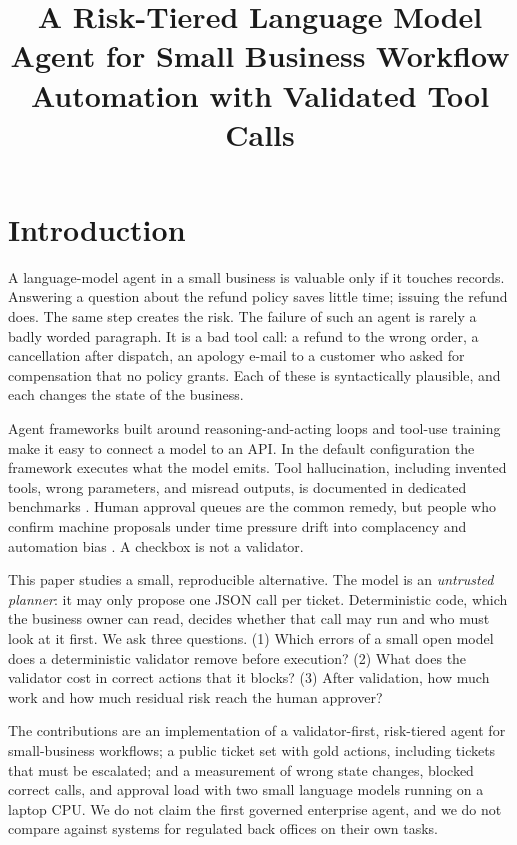 \documentclass{icaiit2027}
\title{A Risk-Tiered Language Model Agent for Small Business Workflow Automation with Validated Tool Calls}
\begin{document}
\maketitle

\section{Introduction}

A language-model agent in a small business is valuable only if it touches records. Answering a question about the refund policy saves little time; issuing the refund does. The same step creates the risk. The failure of such an agent is rarely a badly worded paragraph. It is a bad tool call: a refund to the wrong order, a cancellation after dispatch, an apology e-mail to a customer who asked for compensation that no policy grants. Each of these is syntactically plausible, and each changes the state of the business.

Agent frameworks built around reasoning-and-acting loops \cite{yao2023} and tool-use training \cite{schick2023,qin2024} make it easy to connect a model to an API. In the default configuration the framework executes what the model emits. Tool hallucination, including invented tools, wrong parameters, and misread outputs, is documented in dedicated benchmarks \cite{patil2023,zhang2024}. Human approval queues are the common remedy, but people who confirm machine proposals under time pressure drift into complacency and automation bias \cite{parasuraman2010,goddard2012}. A checkbox is not a validator.

This paper studies a small, reproducible alternative. The model is an \emph{untrusted planner}: it may only propose one JSON call per ticket. Deterministic code, which the business owner can read, decides whether that call may run and who must look at it first. We ask three questions. (1) Which errors of a small open model does a deterministic validator remove before execution? (2) What does the validator cost in correct actions that it blocks? (3) After validation, how much work and how much residual risk reach the human approver?

The contributions are an implementation of a validator-first, risk-tiered agent for small-business workflows; a public ticket set with gold actions, including tickets that must be escalated; and a measurement of wrong state changes, blocked correct calls, and approval load with two small language models running on a laptop CPU. We do not claim the first governed enterprise agent, and we do not compare against systems for regulated back offices on their own tasks.
\end{document}
